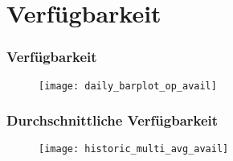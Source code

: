 \section{Verfügbarkeit}
\begin{frame}
    \frametitle{Verfügbarkeit}

    \begin{figure}
        \centering
        \texttt{[image: daily\_barplot\_op\_avail]}
    \end{figure}

\end{frame}

\begin{frame}
    \frametitle{Durchschnittliche Verfügbarkeit}

    \begin{figure}
        \centering
        \texttt{[image: historic\_multi\_avg\_avail]}
    \end{figure}

\end{frame}
